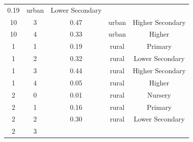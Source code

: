 \documentclass[stu, 12pt, floatsintext,longtable]{apa7}
\begin{document}
\begin{longtable}{ccccc}
    0.19
                                                       &
    urban                                              & Lower Secondary
    \\
    10                                                 & 3                    &
    0.47
                                                       &
    urban                                              & Higher Secondary
    \\
    10                                                 & 4                    &
    0.33
                                                       &
    urban                                              & Higher
    \\
    1                                                  & 1                    &
    0.19
                                                       &
    rural                                              & Primary
    \\
    1                                                  & 2                    &
    0.32
                                                       &
    rural                                              & Lower Secondary
    \\
    1                                                  & 3                    &
    0.44
                                                       &
    rural                                              & Higher Secondary
    \\
    1                                                  & 4                    &
    0.05
                                                       &
    rural                                              & Higher
    \\
    2                                                  & 0                    &
    0.01
                                                       &
    rural                                              & Nursery
    \\
    2                                                  & 1                    &
    0.16
                                                       &
    rural                                              & Primary
    \\
    2                                                  & 2                    &
    0.30
                                                       &
    rural                                              & Lower Secondary
    \\
    2                                                  & 3                    &

\end{longtable}
\end{document}
